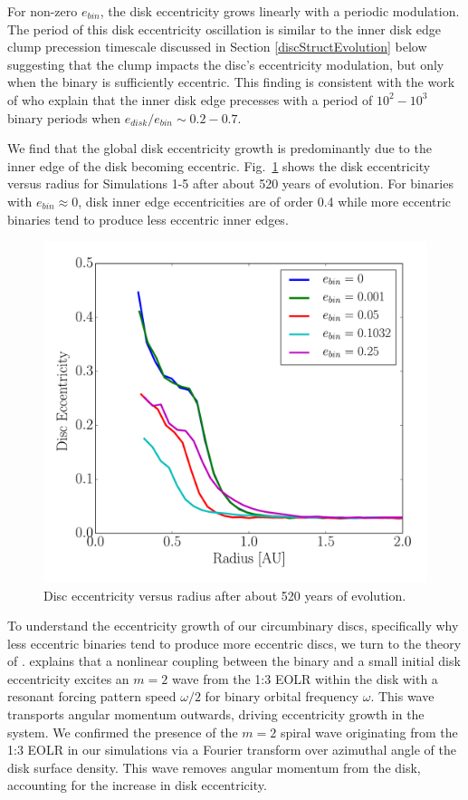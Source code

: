 For non-zero $e_{bin}$, the disk eccentricity grows linearly with a
periodic modulation.  The period of this disk eccentricity oscillation
is similar to the inner disk edge clump precession timescale discussed
in Section \ref{discStructEvolution} below suggesting that the clump impacts the disc's eccentricity modulation, but only when the binary is sufficiently eccentric.  This finding is consistent with the work of \citet{Arty2000} who explain that the inner disk edge precesses with a period of $10^2 - 10^3$ binary periods when $e_{disk}/e_{bin} \sim 0.2-0.7$.  

We find that the global disk eccentricity growth is predominantly due to the inner edge of the disk becoming eccentric.  Fig.~\ref{fig:figure3} shows the disk eccentricity versus radius for Simulations 1-5 after about 520 years of evolution.  For binaries with $e_{bin} \approx 0$, disk inner edge eccentricities are of order 0.4 while more eccentric binaries tend to produce less eccentric inner edges.

\begin{figure}
	\includegraphics[width=\columnwidth]{f3}
    \caption{Disc eccentricity versus radius after about 520 years of evolution.}
    \label{fig:figure3}
\end{figure}

To understand the eccentricity growth of our circumbinary discs,
specifically why less eccentric binaries tend to produce more
eccentric discs, we turn to the theory of \citet{Papaloizou01}.
\citet{Papaloizou01} explains that a nonlinear coupling between the
binary and a small initial disk eccentricity excites an $m = 2$ wave
from the 1:3 EOLR within the disk with a resonant forcing pattern
speed $\omega/2$ for binary orbital frequency $\omega$.  This wave
transports angular momentum outwards, driving eccentricity growth in
the system.  We confirmed the presence of the $m = 2$ spiral wave
originating from the 1:3 EOLR in our simulations via a Fourier transform over azimuthal
angle of the disk surface density.  This wave removes angular momentum from the disk, accounting for the increase in disk eccentricity.  

